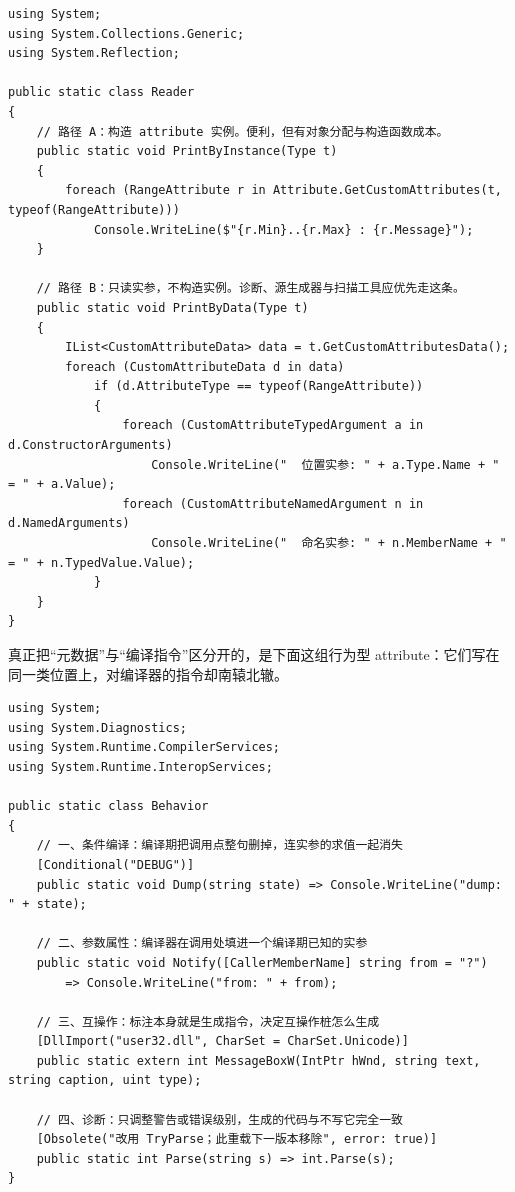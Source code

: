 \documentclass[12pt,a4paper,fontset=fandol]{ctexbook}
\newcommand{\csharplabel}{%
  \tcbox[on line,colback=csharpheadbg,colframe=csharpheadbg,
    boxrule=0pt,arc=1pt,left=2pt,right=2pt,top=1pt,bottom=1pt,
    colupper=white,fontupper=\scriptsize\bfseries]{C\#}}
\begin{document}
\csharplabel
\begin{lstlisting}[style=csharpstyle,caption={同一个标注的两种读取成本：构造实例与只读实参},label={lst:ch3-cs-readpaths}]
using System;
using System.Collections.Generic;
using System.Reflection;

public static class Reader
{
    // 路径 A：构造 attribute 实例。便利，但有对象分配与构造函数成本。
    public static void PrintByInstance(Type t)
    {
        foreach (RangeAttribute r in Attribute.GetCustomAttributes(t, typeof(RangeAttribute)))
            Console.WriteLine($"{r.Min}..{r.Max} : {r.Message}");
    }

    // 路径 B：只读实参，不构造实例。诊断、源生成器与扫描工具应优先走这条。
    public static void PrintByData(Type t)
    {
        IList<CustomAttributeData> data = t.GetCustomAttributesData();
        foreach (CustomAttributeData d in data)
            if (d.AttributeType == typeof(RangeAttribute))
            {
                foreach (CustomAttributeTypedArgument a in d.ConstructorArguments)
                    Console.WriteLine("  位置实参: " + a.Type.Name + " = " + a.Value);
                foreach (CustomAttributeNamedArgument n in d.NamedArguments)
                    Console.WriteLine("  命名实参: " + n.MemberName + " = " + n.TypedValue.Value);
            }
    }
}
\end{lstlisting}

真正把“元数据”与“编译指令”区分开的，是下面这组行为型 attribute：它们写在同一类位置上，对编译器的指令却南辕北辙。

\csharplabel
\begin{lstlisting}[style=csharpstyle,caption={四个行为型 attribute：同一语法位置上的四种截然不同的效果},label={lst:ch3-cs-behavior}]
using System;
using System.Diagnostics;
using System.Runtime.CompilerServices;
using System.Runtime.InteropServices;

public static class Behavior
{
    // 一、条件编译：编译期把调用点整句删掉，连实参的求值一起消失
    [Conditional("DEBUG")]
    public static void Dump(string state) => Console.WriteLine("dump: " + state);

    // 二、参数属性：编译器在调用处填进一个编译期已知的实参
    public static void Notify([CallerMemberName] string from = "?")
        => Console.WriteLine("from: " + from);

    // 三、互操作：标注本身就是生成指令，决定互操作桩怎么生成
    [DllImport("user32.dll", CharSet = CharSet.Unicode)]
    public static extern int MessageBoxW(IntPtr hWnd, string text, string caption, uint type);

    // 四、诊断：只调整警告或错误级别，生成的代码与不写它完全一致
    [Obsolete("改用 TryParse；此重载下一版本移除", error: true)]
    public static int Parse(string s) => int.Parse(s);
}
\end{lstlisting}
\end{document}
